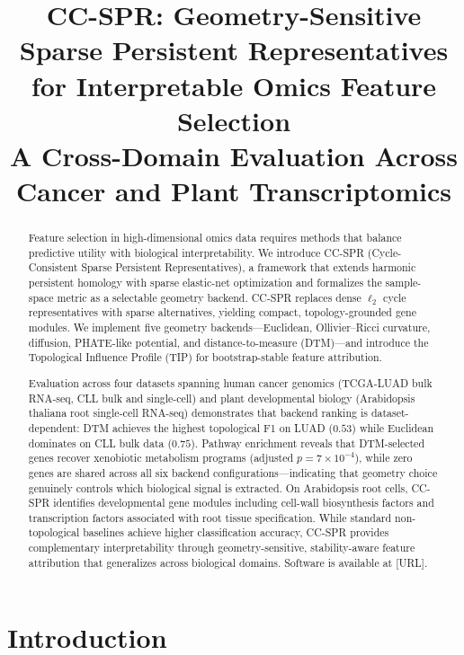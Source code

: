 \documentclass[11pt]{article}
\title{CC-SPR: Geometry-Sensitive Sparse Persistent Representatives\\for Interpretable Omics Feature Selection\\[6pt]
\large A Cross-Domain Evaluation Across Cancer and Plant Transcriptomics}
\author{}
\date{}
\begin{document}
\maketitle

\begin{abstract}
Feature selection in high-dimensional omics data requires methods that balance predictive utility with biological interpretability.
We introduce CC-SPR (Cycle-Consistent Sparse Persistent Representatives), a framework that extends harmonic persistent homology with sparse elastic-net optimization and formalizes the sample-space metric as a selectable geometry backend.
CC-SPR replaces dense $\ell_2$ cycle representatives with sparse alternatives, yielding compact, topology-grounded gene modules.
We implement five geometry backends---Euclidean, Ollivier--Ricci curvature, diffusion, PHATE-like potential, and distance-to-measure (DTM)---and introduce the Topological Influence Profile (TIP) for bootstrap-stable feature attribution.

Evaluation across four datasets spanning human cancer genomics (TCGA-LUAD bulk RNA-seq, CLL bulk and single-cell) and plant developmental biology (Arabidopsis thaliana root single-cell RNA-seq) demonstrates that backend ranking is dataset-dependent: DTM achieves the highest topological F1 on LUAD ($0.53$) while Euclidean dominates on CLL bulk data ($0.75$).
Pathway enrichment reveals that DTM-selected genes recover xenobiotic metabolism programs (adjusted $p = 7 \times 10^{-4}$), while zero genes are shared across all six backend configurations---indicating that geometry choice genuinely controls which biological signal is extracted.
On Arabidopsis root cells, CC-SPR identifies developmental gene modules including cell-wall biosynthesis factors and transcription factors associated with root tissue specification.
While standard non-topological baselines achieve higher classification accuracy, CC-SPR provides complementary interpretability through geometry-sensitive, stability-aware feature attribution that generalizes across biological domains.
Software is available at [URL].
\end{abstract}

\section{Introduction}
\label{sec:introduction}
\end{document}
